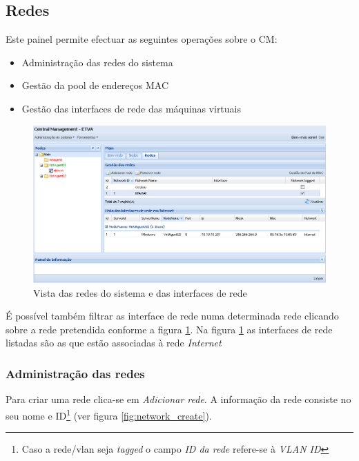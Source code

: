 \subsection{Redes}
\label{sub:redes}

Este painel permite efectuar as seguintes operações sobre o CM:

\begin{itemize}
	\item Administração das redes do sistema
	\item Gestão da pool de endereços MAC
	\item Gestão das interfaces de rede das máquinas virtuais 
\end{itemize}

\begin{figure}[H]
	\begin{center}
	\includegraphics[scale=0.45]{screenshots/main_networks.png}
	\caption{Vista das redes do sistema  e das interfaces de rede}
	\label{fig:main_networks}
	\end{center}
\end{figure}

É possível também filtrar as interface de rede numa determinada rede clicando sobre a rede pretendida conforme a figura \ref{fig:main_networks}.
Na figura \ref{fig:main_networks} as interfaces de rede listadas são as que estão associadas à rede \emph{Internet}

\subsubsection{Administração das redes}

Para criar uma rede clica-se em \emph{Adicionar rede}.
A informação da rede consiste no seu nome e ID\footnote{Caso a rede/vlan seja \emph{tagged} o campo \emph{ID da rede} refere-se à \emph{VLAN ID}} (ver figura \ref{fig:network_create}).

